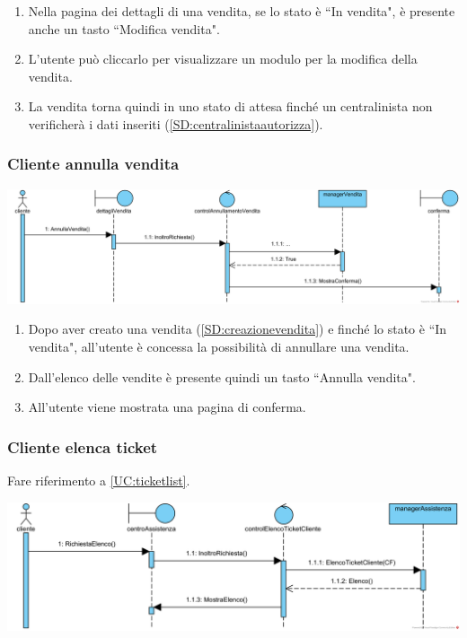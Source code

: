 \documentclass[12pt]{article}
\begin{document}
\begin{enumerate}
\item Nella pagina dei dettagli di una vendita, se lo stato è ``In vendita", è presente anche un tasto ``Modifica vendita".
\item L'utente può cliccarlo per visualizzare un modulo per la modifica della vendita. 
\item La vendita torna quindi in uno stato di attesa finché un centralinista non verificherà i dati inseriti (\ref{SD:centralinistaautorizza}).
\end{enumerate}

\newpage

\subsubsection{Cliente annulla vendita}
\label{SD:annullavendita}

\begin{center}
\includegraphics[width=\textwidth]{SequenceDiagram/ClienteVenditaAnnulla}
\end{center}

\begin{enumerate}
\item Dopo aver creato una vendita (\ref{SD:creazionevendita}) e finché lo stato è ``In vendita", all'utente è concessa la possibilità di annullare una vendita.
\item Dall'elenco delle vendite è presente quindi un tasto ``Annulla vendita".
\item All'utente viene mostrata una pagina di conferma.
\end{enumerate}

\newpage

\subsubsection{Cliente elenca ticket}
\label{SD:elencoticket}
Fare riferimento a \ref{UC:ticketlist}. \\

\begin{center}
\includegraphics[width=\textwidth]{SequenceDiagram/ClienteTicketElenco}
\end{center}
\end{document}
